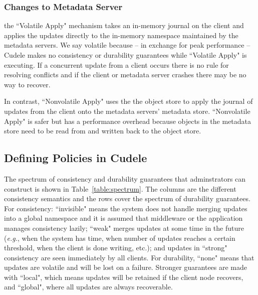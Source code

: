 \subsubsection{Changes to Metadata Server} the ``Volatile Apply" mechanism
takes an in-memory journal on the client and applies the updates directly to
the in-memory namespace maintained by the metadata servers. We say volatile
because -- in exchange for peak performance -- Cudele makes no consistency or
durability guarantees while ``Volatile Apply" is executing.  If a concurrent
update from a client occurs there is no rule for resolving conflicts and if the
client or metadata server crashes there may be no way to recover. 

In contrast, ``Nonvolatile Apply" uses the the object store to apply the
journal of updates from the client onto the metadata servers' metadata store.
``Nonvolatile Apply" is safer but has a performance overhead because objects in
the metadata store need to be read from and written back to the object store.


\subsection{Defining Policies in Cudele}
\label{sec:setting-policies-with-cudele}

The spectrum of consistency and durability guarantees that adminstrators can
construct is shown in Table~\ref{table:spectrum}. The columns are the different
consistency semantics and the rows cover the spectrum of durability guarantees.
For consistency: ``invisible" means the system does not handle merging updates
into a global namespace and it is assumed that middleware or the application
manages consistency lazily; ``weak" merges updates at some time in the
future ({\it e.g.}, when the system has time, when number of updates reaches a
certain threshold, when the client is done writing, etc.); and updates in
``strong" consistency are seen immediately by all clients. For durability,
``none" means that updates are volatile and will be lost on a failure. Stronger
guarantees are made with ``local", which means updates will be retained if the
client node recovers, and ``global", where all updates are always recoverable.

